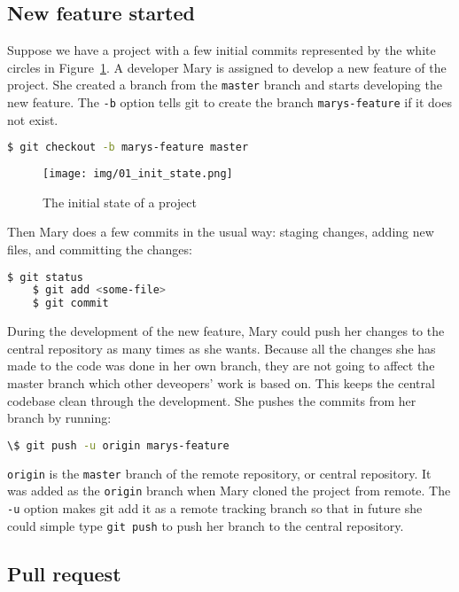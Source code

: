 \documentclass{article}
\begin{document}
\subsection{New feature started}

Suppose we have a project with a few initial commits represented by the white
circles in Figure~\ref{fig.01_init_state}. A developer Mary is assigned to
develop a new feature of the project. She created a branch from the
\texttt{master} branch and starts developing the new feature. The \texttt{-b}
option tells git to create the branch \texttt{marys-feature} if it does not
exist. 

\begin{lstlisting}[language=bash]
	$ git checkout -b marys-feature master
\end{lstlisting}

\begin{figure}
	\texttt{[image: img/01\_init\_state.png]}
	\caption{The initial state of a project}
	\label{fig.01_init_state}
\end{figure}

Then Mary does a few commits in the usual way: staging changes, adding new files, and committing the changes:

\begin{lstlisting}[language=bash]
	$ git status
	$ git add <some-file>
	$ git commit
\end{lstlisting}

During the development of the new feature, Mary could push her changes to the central repository as many times as she wants. Because all the changes she has made to the code was done in her own branch, they are not going to affect the master branch which other deveopers' work is based on. This keeps the central codebase clean through the development. She pushes the commits from her branch by running: 

\begin{lstlisting}[language=bash]
	\$ git push -u origin marys-feature 
\end{lstlisting}

\texttt{origin} is the \texttt{master} branch of the remote repository, or central repository. It was added as the \texttt{origin} branch when Mary cloned the project from remote. The \texttt{-u} option makes git add it as a remote tracking branch so that in future she could simple type \texttt{git push} to push her branch to the central repository.

\subsection{Pull request}
\end{document}
